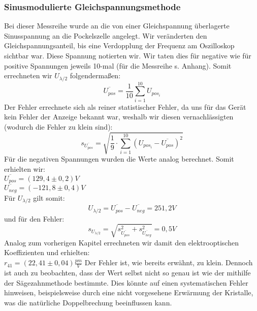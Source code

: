 \subsubsection{Sinusmodulierte Gleichspannungsmethode}
Bei dieser Messreihe wurde an die von einer Gleichspannung überlagerte Sinusspannung an die Pockelszelle angelegt. Wir veränderten den Gleichspannungsanteil, bis eine Verdopplung der Frequenz am Oszilloskop sichtbar war. Diese Spannung notierten wir. Wir taten dies für negative wie für positive Spannungen jeweils 10-mal (für die Messreihe s. Anhang). Somit errechneten wir $U_{\lambda/2}$ folgendermaßen:\\
\[\overline{U_{pos}}=\frac{1}{10}\sum\limits_{i=1}^{10}U_{pos_{i}}\]
Der Fehler errechnete sich als reiner statistischer Fehler, da uns für das Gerät kein Fehler der Anzeige bekannt war, weshalb wir diesen vernachlässigten (wodurch die Fehler zu klein sind):\\
\[s_{\overline{U_{pos}}}=\sqrt{\frac{1}{9}\cdot\sum\limits_{i=1}^{10}\left(U_{pos_{i}}-\overline{U_{pos}}\right)^{2}}\]
Für die negativen Spannungen wurden die Werte analog berechnet. Somit erhielten wir:\\
$\overline{U_{pos}}=(129,4\pm0,2)V$\\
$\overline{U_{neg}}=(-121,8\pm0,4)V$\\
Für $U_{\lambda/2}$ gilt somit:\\
\[U_{\lambda/2}=\overline{U_{pos}}-\overline{U_{neg}}=251,2 V\] und für den Fehler: \[s_{U_{\lambda/2}}=\sqrt{s_{\overline{U_{pos}}}^{2}+s_{\overline{U_{neg}}}^{2}}=0,5 V\]
Analog zum vorherigen Kapitel errechneten wir damit den elektrooptischen Koeffizienten und erhielten:\\
$r_{41}=(22,41\pm0,04)\frac{pm}{V}$
Der Fehler ist, wie bereits erwähnt, zu klein. Dennoch ist auch zu beobachten, dass der Wert selbst nicht so genau ist wie der mithilfe der Sägezahnmethode bestimmte. Dies könnte auf einen systematischen Fehler hinweisen, beispielsweise durch eine nicht vorgesehene Erwärmung der Kristalle, was die natürliche Doppelbrechung beeinflussen kann.


